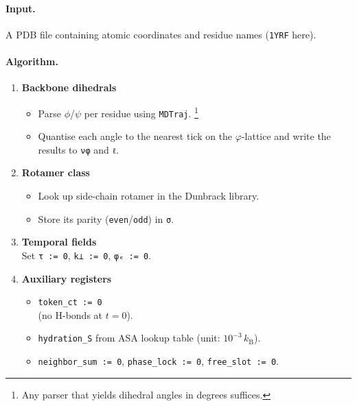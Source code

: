 \documentclass[11pt,a4paper]{article}
\begin{document}
\paragraph{Input.}  A PDB file containing atomic coordinates and
residue names (\texttt{1YRF} here).

\paragraph{Algorithm.}
\begin{enumerate}
  \item \textbf{Backbone dihedrals}\\[-0.4em]
        \begin{itemize}
          \item Parse $\phi$/$\psi$ per residue using \texttt{MDTraj}.%
                \footnote{Any parser that yields dihedral angles in
                degrees suffices.}
          \item Quantise each angle to the nearest tick on the
                $\varphi$-lattice and write the results to
                \texttt{νφ} and \texttt{ℓ}.
        \end{itemize}
  \item \textbf{Rotamer class}\\[-0.4em]
        \begin{itemize}
          \item Look up side-chain rotamer in the Dunbrack library.  
          \item Store its parity (\texttt{even}/\texttt{odd}) in
                \texttt{σ}.
        \end{itemize}
  \item \textbf{Temporal fields}\\[-0.4em]
        Set \texttt{τ := 0}, \texttt{k⊥ := 0}, \texttt{φₑ := 0}.
  \item \textbf{Auxiliary registers}\\[-0.4em]
        \begin{itemize}
          \item \texttt{token\_ct := 0}\\
                (no H-bonds at $t=0$).
          \item \texttt{hydration\_S} from ASA lookup table
                (unit: $10^{-3}\,k_\text{B}$).
          \item \texttt{neighbor\_sum := 0}, \texttt{phase\_lock := 0},
                \texttt{free\_slot := 0}.
        \end{itemize}
\end{enumerate}
\end{document}
